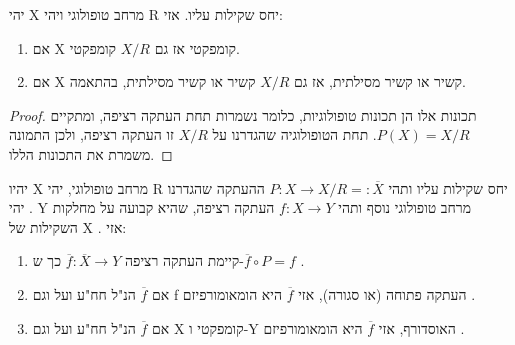 \documentclass{tstextbook}
\begin{document}
\begin{lemma}
יהי X מרחב טופולוגי ויהי R יחס שקילות עליו. אזי:

  \begin{enumerate}
    \item אם X קומפקטי אז גם \(X/R\) קומפקטי. 


    \item אם X קשיר או קשיר מסילתית, אז גם \(X/R\) קשיר או קשיר מסילתית, בהתאמה. 


  \end{enumerate}
\end{lemma}
\begin{proof}
תכונות אלו הן תכונות טופולוגיות, כלומר נשמרות תחת העתקה רציפה, ומתקיים \(P(X)=X/R\). תחת הטופולוגיה שהגדרנו על \(X/R\) זו העתקה רציפה, ולכן התמונה משמרת את התכונות הללו.

\end{proof}
\begin{lemma}
יהיו X מרחב טופולוגי, יהי R יחס שקילות עליו ותהי \(P:X\rightarrow X/R=:\overline{X}\) ההעתקה שהגדרנו .
יהי Y מרחב טופולוגי נוסף ותהי \(f:X\rightarrow Y\) העתקה רציפה, שהיא קבועה על מחלקות השקילות של X . אזי:

  \begin{enumerate}
    \item קיימת העתקה רציפה \(\overline{f}:\overline{X}\rightarrow Y\) כך ש-\(\overline{f}\circ P=f\) . 


    \item אם \(\overline{f}\) הנ"ל חח"ע ועל וגם f העתקה פתוחה (או סגורה), אזי \(\overline{f}\) היא הומאומורפיזם . 


    \item אם \(\overline{f}\) הנ"ל חח"ע ועל וגם X קומפקטי ו-Y האוסדורף, אזי \(\overline{f}\) היא הומאומורפיזם . 


  \end{enumerate}
\end{lemma}
\end{document}
